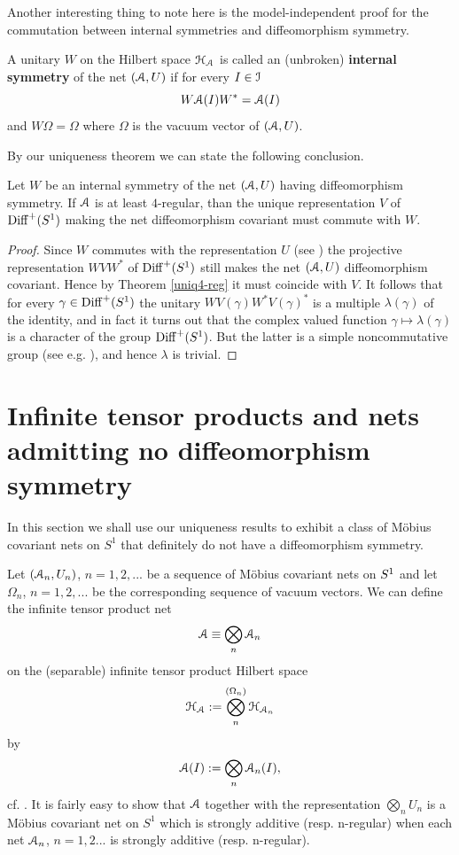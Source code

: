 \documentclass[12pt]{article}
\begin{document}
Another interesting thing to note here is the model-independent 
proof for the commutation between internal symmetries and diffeomorphism
symmetry.
\begin{definition}
A unitary $W$ on the Hilbert space ${\mathcal H}_{\mathcal A}$ is called an (unbroken) 
{\bf internal symmetry} of the net $({\mathcal A},U)$ if for every $I \in {\mathcal I}$
\begin{equation}
W {\mathcal A}(I) W^*={\mathcal A}(I)
\end{equation}
and $W\Omega=\Omega$ where $\Omega$ is the vacuum vector of $({\mathcal A},U)$.
\end{definition}
By our uniqueness theorem we can state the following conclusion.
\begin{corollary}
\label{com_int} 
Let $W$ be an internal symmetry of the net $({\mathcal A},U)$
having diffeomorphism symmetry. If ${\mathcal A}$ is at least $4$-regular,
than the unique representation $V$ of ${{\rm Diff}^+(S^1)}$ making the
net diffeomorphism covariant must commute with $W$. 
\end{corollary}
\begin{proof}
Since $W$ commutes with the representation $U$ (see \cite{FrG})
the projective representation $WVW^*$ of ${{\rm Diff}^+(S^1)}$ still makes 
the net $({\mathcal A},U)$ diffeomorphism covariant. Hence by Theorem
\ref{uniq4-reg} it must coincide with $V$. It follows that
for every $\gamma \in {{\rm Diff}^+(S^1)}$ the unitary 
$WV(\gamma)W^*V(\gamma)^*$ is a multiple
$\lambda(\gamma)$ of the identity, and in fact 
it turns out that the complex valued function
$\gamma \mapsto \lambda(\gamma)$ is a character of 
the group ${{\rm Diff}^+(S^1)}$. But the latter is a simple 
noncommutative group (see e.g. \cite{Milnor}), 
and hence $\lambda$ is trivial.
\end{proof}
\section{Infinite tensor products and nets admitting no
diffeomorphism symmetry}
\label{secttensorproduct}
In this section we shall use our uniqueness results to exhibit a class of 
M\"obius covariant nets on $S^1$ that definitely do not have a
diffeomorphism symmetry. 

Let $({\mathcal A}_n, U_n)$, $n=1,2,...$ be a sequence of M\"obius covariant nets on 
$\s1$ and let $\Omega_n$, $n=1,2,...$ be the corresponding sequence of 
vacuum vectors. We can define the infinite tensor product net 
\begin{equation}
{\mathcal A} \equiv \bigotimes_n {\mathcal A}_n 
\end{equation}
on the 
(separable) infinite tensor product 
Hilbert space 
$${\mathcal H}_{\mathcal A}:=\bigotimes_n^{(\Omega_n)}{\mathcal H}_{{\mathcal A}_n}$$ 
by 
\begin{equation}
{\mathcal A}(I):= \bigotimes_n{\mathcal A}_n(I),
\end{equation}
cf. \cite{VN38}.
It is fairly easy to show that ${\mathcal A}$ together with the representation 
$\bigotimes_n U_n$ is a M\"{o}bius covariant net on $S^1$ which is strongly 
additive (resp. n-regular) when each net ${\mathcal A}_n$, $n=1,2 ...$ is strongly 
additive (resp. n-regular). 
\end{document}
